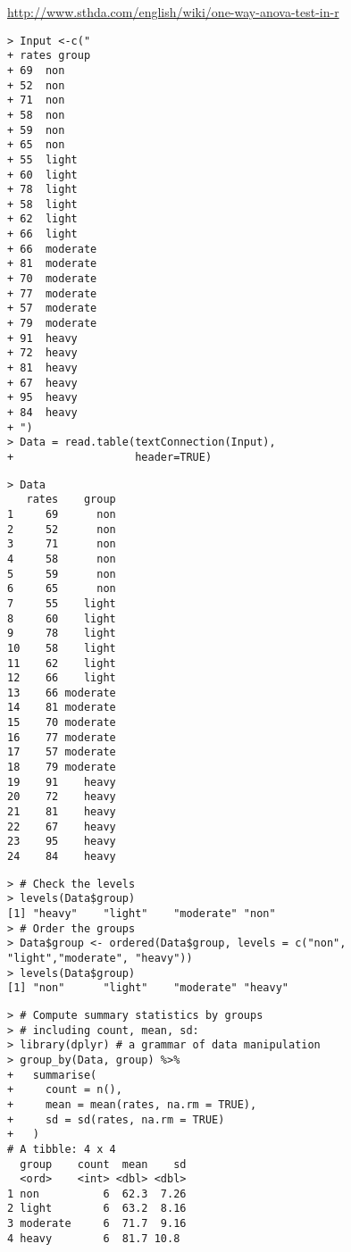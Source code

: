 \begin{frame}[fragile]{\small\url{http://www.sthda.com/english/wiki/one-way-anova-test-in-r}}
	\begin{minipage}{0.45\textwidth}
	\begin{lstlisting}
> Input <-c("
+ rates group
+ 69  non
+ 52  non
+ 71  non
+ 58  non
+ 59  non
+ 65  non
+ 55  light
+ 60  light
+ 78  light
+ 58  light
+ 62  light
+ 66  light
+ 66  moderate
+ 81  moderate
+ 70  moderate
+ 77  moderate
+ 57  moderate
+ 79  moderate
+ 91  heavy
+ 72  heavy
+ 81  heavy
+ 67  heavy
+ 95  heavy
+ 84  heavy
+ ")
> Data = read.table(textConnection(Input),
+                   header=TRUE)
	\end{lstlisting}
	\end{minipage}
	\hfill
	\begin{minipage}{0.45\textwidth}
	\begin{lstlisting}
> Data
   rates    group
1     69      non
2     52      non
3     71      non
4     58      non
5     59      non
6     65      non
7     55    light
8     60    light
9     78    light
10    58    light
11    62    light
12    66    light
13    66 moderate
14    81 moderate
15    70 moderate
16    77 moderate
17    57 moderate
18    79 moderate
19    91    heavy
20    72    heavy
21    81    heavy
22    67    heavy
23    95    heavy
24    84    heavy
	\end{lstlisting}
	\end{minipage}
\end{frame}
\begin{frame}[fragile]
	\begin{center}
	\begin{lstlisting}
> # Check the levels
> levels(Data$group)
[1] "heavy"    "light"    "moderate" "non"
> # Order the groups
> Data$group <- ordered(Data$group, levels = c("non", "light","moderate", "heavy"))
> levels(Data$group)
[1] "non"      "light"    "moderate" "heavy"
	\end{lstlisting}
	\vfill
	\begin{lstlisting}
> # Compute summary statistics by groups
> # including count, mean, sd:
> library(dplyr) # a grammar of data manipulation
> group_by(Data, group) %>%
+   summarise(
+     count = n(),
+     mean = mean(rates, na.rm = TRUE),
+     sd = sd(rates, na.rm = TRUE)
+   )
# A tibble: 4 x 4
  group    count  mean    sd
  <ord>    <int> <dbl> <dbl>
1 non          6  62.3  7.26
2 light        6  63.2  8.16
3 moderate     6  71.7  9.16
4 heavy        6  81.7 10.8
	\end{lstlisting}
	\end{center}
\end{frame}
